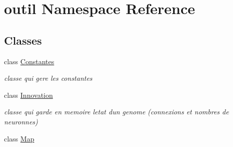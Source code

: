 \hypertarget{namespaceoutil}{}\section{outil Namespace Reference}
\label{namespaceoutil}
\subsection*{Classes}
\begin{DoxyCompactItemize}
\item 
class \hyperlink{classoutil_1_1_constantes}{Constantes}
\begin{DoxyCompactList}\small\item\em classe qui gere les constantes \end{DoxyCompactList}\item 
class \hyperlink{classoutil_1_1_innovation}{Innovation}
\begin{DoxyCompactList}\small\item\em classe qui garde en memoire l\textquotesingle{}etat d\textquotesingle{}un genome (connexions et nombres de neuronnes) \end{DoxyCompactList}\item 
class \hyperlink{classoutil_1_1_map}{Map}
\end{DoxyCompactItemize}
